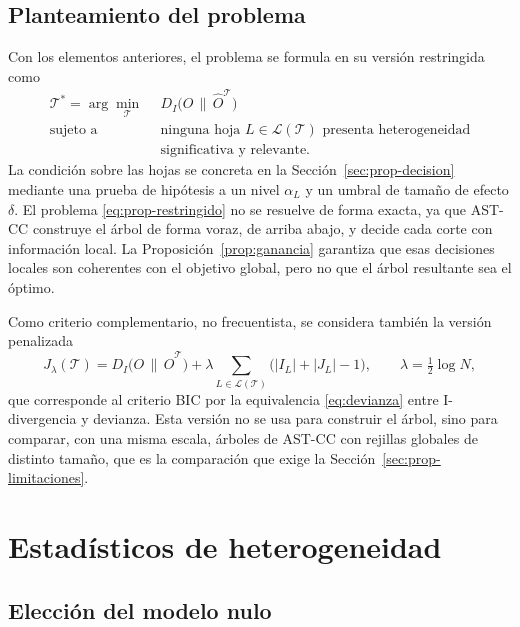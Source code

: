 \subsection{Planteamiento del problema}\label{sec:prop-problema}

Con los elementos anteriores, el problema se formula en su versión restringida
como
\begin{equation}\label{eq:prop-restringido}
  \begin{aligned}
    \mathcal{T}^\ast = \arg\min_{\mathcal{T}}\ \ & D_I\bigl(O\,\|\,\hat O^{\mathcal{T}}\bigr)\\
    \text{sujeto a}\ \ & \text{ninguna hoja } L\in\mathcal{L}(\mathcal{T})
      \text{ presenta heterogeneidad}\\
      & \text{significativa y relevante.}
  \end{aligned}
\end{equation}
La condición sobre las hojas se concreta en la Sección~\ref{sec:prop-decision}
mediante una prueba de hipótesis a un nivel $\alpha_L$ y un umbral de tamaño
de efecto $\delta$. El problema \eqref{eq:prop-restringido} no se resuelve de
forma exacta, ya que AST-CC construye el árbol de forma voraz, de arriba abajo, y
decide cada corte con información local. La Proposición~\ref{prop:ganancia}
garantiza que esas decisiones locales son coherentes con el objetivo global,
pero no que el árbol resultante sea el óptimo.

Como criterio complementario, no frecuentista, se considera también la versión
penalizada
\begin{equation}\label{eq:prop-bic}
  J_\lambda(\mathcal{T}) = D_I\bigl(O\,\|\,\hat O^{\mathcal{T}}\bigr)
  + \lambda \sum_{L\in\mathcal{L}(\mathcal{T})}\bigl(|I_L|+|J_L|-1\bigr),
  \qquad \lambda = \tfrac12\log N,
\end{equation}
que corresponde al criterio BIC por la equivalencia \eqref{eq:devianza} entre
I-divergencia y devianza. Esta versión no se usa para construir el árbol, sino
para comparar, con una misma escala, árboles de AST-CC con rejillas globales de
distinto tamaño, que es la comparación que exige la
Sección~\ref{sec:prop-limitaciones}.

\section{Estadísticos de heterogeneidad}\label{sec:prop-estadisticos}

\subsection{Elección del modelo nulo}

